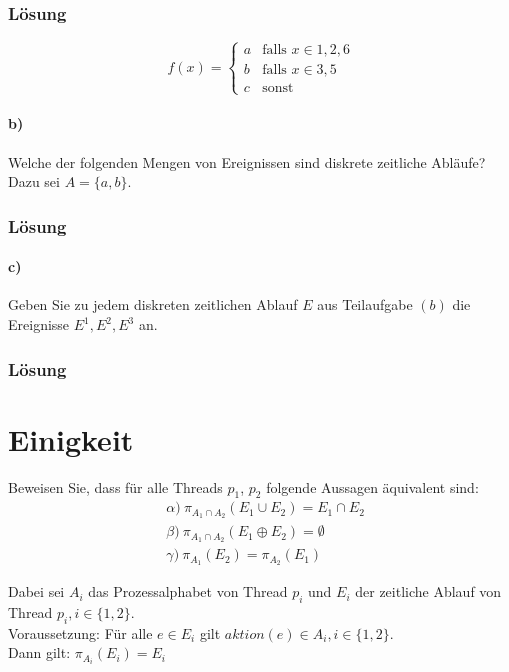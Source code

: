 \documentclass[a4paper]{scrartcl}
\begin{document}
\subsubsection*{Lösung}
\begin{equation*}
\ f(x) = 
\begin{cases}
a & \text{falls } x \in {1, 2, 6}\\
b & \text{falls } x \in {3, 5}\\
c & \text{sonst}
\end{cases}
\end{equation*}

\paragraph{b)} Welche der folgenden Mengen von Ereignissen sind diskrete zeitliche Abläufe? Dazu sei $ A = \{a, b\} $.  

\subsubsection*{Lösung}

\paragraph{c)} Geben Sie zu jedem diskreten zeitlichen Ablauf $ E $ aus Teilaufgabe $ (b) $ die Ereignisse $E^1, E^2, E^3 $ an.

\subsubsection*{Lösung}

\section{Einigkeit}
Beweisen Sie, dass für alle Threads $ p_1 $, $ p_2 $ folgende Aussagen äquivalent sind:
\begin{align*}
& \alpha) \ \pi_{A_1 \cap A_2} \left(E_1 \cup E_2\right) = E_1 \cap E_2\\
& \beta) \ \pi_{A_1 \cap A_2} \left(E_1 \oplus E_2\right) = \emptyset\\
& \gamma) \ \pi_{A_1} \left(E_2\right) = \pi_{A_2} \left(E_1\right)
\end{align*}

Dabei sei $ A_i $ das Prozessalphabet von Thread $ p_i $ und $ E_i $ der zeitliche Ablauf von Thread $ p_i, i \in \{1, 2\}$.\\
Voraussetzung: Für alle $ e \in E_i $ gilt $ aktion(e) \in A_i, i \in \{1, 2\} $.\\
Dann gilt: $ \pi_{A_i} \left(E_i\right) = E_i $\\
\end{document}
